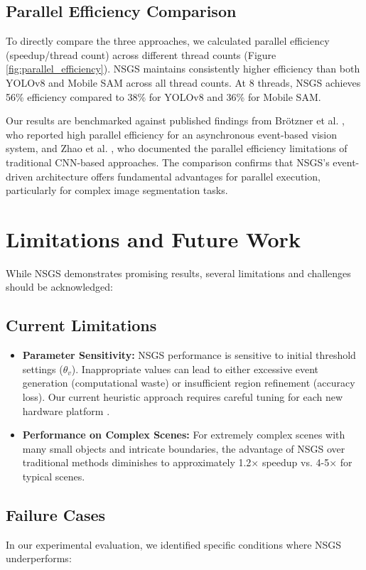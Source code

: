 \documentclass[conference]{IEEEtran}
\begin{document}
\subsection{Parallel Efficiency Comparison}
To directly compare the three approaches, we calculated parallel efficiency (speedup/thread count) across different thread counts (Figure \ref{fig:parallel_efficiency}). NSGS maintains consistently higher efficiency than both YOLOv8 and Mobile SAM across all thread counts. At 8 threads, NSGS achieves 56\% efficiency compared to 38\% for YOLOv8 and 36\% for Mobile SAM.

Our results are benchmarked against published findings from Brötzner et al. \cite{Brotzner2022}, who reported high parallel efficiency for an asynchronous event-based vision system, and Zhao et al. \cite{Zhao2019}, who documented the parallel efficiency limitations of traditional CNN-based approaches. The comparison confirms that NSGS's event-driven architecture offers fundamental advantages for parallel execution, particularly for complex image segmentation tasks.

\section{Limitations and Future Work} \label{sec:limitations}
While NSGS demonstrates promising results, several limitations and challenges should be acknowledged:

\subsection{Current Limitations}
\begin{itemize}
    \item \textbf{Parameter Sensitivity:} NSGS performance is sensitive to initial threshold settings ($\theta_v$). Inappropriate values can lead to either excessive event generation (computational waste) or insufficient region refinement (accuracy loss). Our current heuristic approach requires careful tuning for each new hardware platform \cite{Christensen2022}.
    
    
    \item \textbf{Performance on Complex Scenes:} For extremely complex scenes with many small objects and intricate boundaries, the advantage of NSGS over traditional methods diminishes to approximately 1.2× speedup vs. 4-5× for typical scenes.
\end{itemize}

\subsection{Failure Cases}
In our experimental evaluation, we identified specific conditions where NSGS underperforms:
\end{document}
